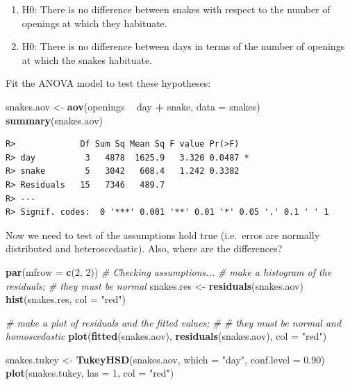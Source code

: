 \documentclass[english,10pt,a4paper,oneside]{book}
\providecommand{\tightlist}{%
  \setlength{\itemsep}{0pt}\setlength{\parskip}{0pt}}
\newenvironment{Shaded}{\begin{snugshade}}{\end{snugshade}}
\newcommand{\CommentTok}[1]{\textcolor[rgb]{0.56,0.35,0.01}{\textit{#1}}}
\newcommand{\DataTypeTok}[1]{\textcolor[rgb]{0.13,0.29,0.53}{#1}}
\newcommand{\DecValTok}[1]{\textcolor[rgb]{0.00,0.00,0.81}{#1}}
\newcommand{\FloatTok}[1]{\textcolor[rgb]{0.00,0.00,0.81}{#1}}
\newcommand{\KeywordTok}[1]{\textcolor[rgb]{0.13,0.29,0.53}{\textbf{#1}}}
\newcommand{\NormalTok}[1]{#1}
\newcommand{\OperatorTok}[1]{\textcolor[rgb]{0.81,0.36,0.00}{\textbf{#1}}}
\newcommand{\StringTok}[1]{\textcolor[rgb]{0.31,0.60,0.02}{#1}}
\theoremstyle{definition}
\theoremstyle{definition}
\theoremstyle{definition}
\theoremstyle{remark}
\begin{document}
\begin{enumerate}
\def\labelenumi{\arabic{enumi}.}
\tightlist
\item
  H0: There is no difference between snakes with respect to the number
  of openings at which they habituate.
\item
  H0: There is no difference between days in terms of the number of
  openings at which the snakes habituate.
\end{enumerate}

Fit the ANOVA model to test these hypotheses:

\begin{Shaded}
\begin{Highlighting}[]
\NormalTok{snakes.aov <-}\StringTok{ }\KeywordTok{aov}\NormalTok{(openings }\OperatorTok{~}\StringTok{ }\NormalTok{day }\OperatorTok{+}\StringTok{ }\NormalTok{snake, }\DataTypeTok{data =}\NormalTok{ snakes)}
\KeywordTok{summary}\NormalTok{(snakes.aov)}
\end{Highlighting}
\end{Shaded}

\begin{verbatim}
R>             Df Sum Sq Mean Sq F value Pr(>F)  
R> day          3   4878  1625.9   3.320 0.0487 *
R> snake        5   3042   608.4   1.242 0.3382  
R> Residuals   15   7346   489.7                 
R> ---
R> Signif. codes:  0 '***' 0.001 '**' 0.01 '*' 0.05 '.' 0.1 ' ' 1
\end{verbatim}

Now we need to test of the assumptions hold true (i.e.~erros are
normally distributed and heteroscedastic). Also, where are the
differences?

\begin{Shaded}
\begin{Highlighting}[]
\KeywordTok{par}\NormalTok{(}\DataTypeTok{mfrow =} \KeywordTok{c}\NormalTok{(}\DecValTok{2}\NormalTok{, }\DecValTok{2}\NormalTok{))}
\CommentTok{# Checking assumptions...}
\CommentTok{# make a histogram of the residuals;}
\CommentTok{# they must be normal}
\NormalTok{snakes.res <-}\StringTok{ }\KeywordTok{residuals}\NormalTok{(snakes.aov)}
\KeywordTok{hist}\NormalTok{(snakes.res, }\DataTypeTok{col =} \StringTok{"red"}\NormalTok{)}

\CommentTok{# make a plot of residuals and the fitted values;}
\CommentTok{# # they must be normal and homoscedastic}
\KeywordTok{plot}\NormalTok{(}\KeywordTok{fitted}\NormalTok{(snakes.aov), }\KeywordTok{residuals}\NormalTok{(snakes.aov), }\DataTypeTok{col =} \StringTok{"red"}\NormalTok{)}

\NormalTok{snakes.tukey <-}\StringTok{ }\KeywordTok{TukeyHSD}\NormalTok{(snakes.aov, }\DataTypeTok{which =} \StringTok{"day"}\NormalTok{, }\DataTypeTok{conf.level =} \FloatTok{0.90}\NormalTok{)}
\KeywordTok{plot}\NormalTok{(snakes.tukey, }\DataTypeTok{las =} \DecValTok{1}\NormalTok{, }\DataTypeTok{col =} \StringTok{"red"}\NormalTok{)}
\end{Highlighting}
\end{Shaded}
\end{document}
